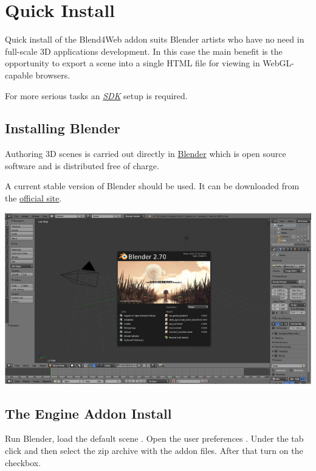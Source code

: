 \documentclass[a4paper,12pt,oneside]{sphinxmanual}
\begin{document}
\chapter{Quick Install}
\label{first_steps:quick-install}\label{first_steps::doc}\label{first_steps:id1}
Quick install of the Blend4Web addon suits Blender artists who have no need in full-scale 3D applications development. In this case the main benefit is the opportunity to export a scene into a single HTML file for viewing in WebGL-capable browsers.

For more serious tasks an {\hyperref[setup:setup]{\emph{SDK}}} setup is required.


\section{Installing Blender}
\label{first_steps:quick-install-blender}\label{first_steps:blender}
Authoring 3D scenes is carried out directly in \href{http://en.wikipedia.org/wiki/Blender\_(software)}{Blender} which is open source software and is distributed free of charge.

A current stable version of Blender should be used. It can be downloaded from the \href{http://www.blender.org/download}{official site}.

{\hfill\includegraphics[width=1.000\linewidth]{blender_first_run.jpg}\hfill}


\section{The Engine Addon Install}
\label{first_steps:quick-install-addon}\label{first_steps:id4}\label{first_steps:index-0}
Run Blender, load the default scene . Open the user preferences . Under the  tab click  and then select the zip archive with the addon files. After that turn on the   checkbox.
\end{document}
